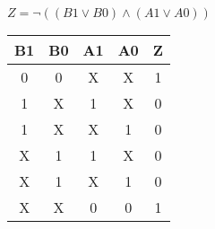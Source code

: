 
\begin{center}
    {\(Z = \lnot ((B1 \lor B0) \land (A1 \lor A0)) \)}
    \begin{table}[h] %
        \begin{center}
            \begin{tabular}{|c|c|c|c||c|} \hline
            B1 & B0 & A1 & A0 & Z \\ \hline\hline
            0  & 0  & X  & X  & 1 \\ \hline
            1  & X  & 1  & X  & 0 \\ \hline
            1  & X  & X  & 1  & 0 \\ \hline
            X  & 1  & 1  & X  & 0 \\ \hline
            X  & 1  & X  & 1  & 0 \\ \hline
            X  & X  & 0  & 0  & 1 \\ \hline
            \end{tabular}
        \end{center}
    \end{table}
\end{center}
